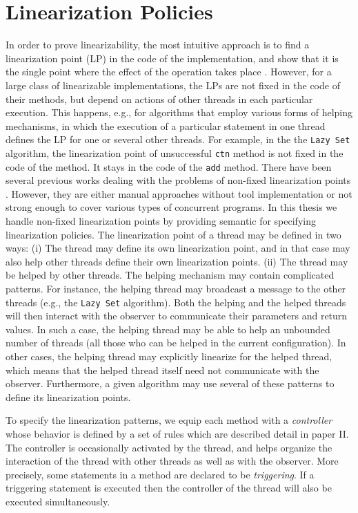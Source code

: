 \section*{Linearization Policies}
\label{controllers:subsection}
In order to prove linearizability, the most intuitive approach is to find a linearization point (LP) in the code of the implementation, and show that it is the single point where the effect of the operation takes place \cite{AHHR:integrated:rep,BLMRS:cav08,Vafeiadis}. However, for a large class of linearizable implementations,
the LPs are not fixed in the code of their methods, but depend on actions
of other threads in each particular execution. This happens, e.g., for algorithms that
employ various forms of helping mechanisms, in which the execution of a particular
statement in one thread defines the LP for one or several other threads. For example, in the the {\tt Lazy Set} algorithm, the linearization point of unsuccessful {\tt ctn} method is not fixed in the code of the method. It stays in the code of the {\tt add} method. There have been several previous works dealing with the problems of non-fixed linearization points \cite{Poling,Colvin:Lazy-List,CGLM:cav06,SWD:cav12,Derrick:fm14,SDW:tcl14,Vafeiadis:cav10,Vafeiadis:Aspect}. However, they are either manual approaches without tool implementation or not strong enough to cover various types of concurrent programs. In this thesis we handle non-fixed linearization points by providing semantic for specifying linearization policies. The linearization point of a thread may be defined in two ways:
(i) The thread may define its own linearization point,
and in that case may also help other threads define their 
own linearization points.
(ii) The thread may be helped by other threads.
%
The helping mechanism may contain complicated patterns.
%
For instance, the helping thread may broadcast a message to the other threads
(e.g., the {\tt Lazy Set} algorithm).
%
Both the helping and the helped threads will then interact with the observer to
communicate their parameters and return values.
%
In such a case, the helping thread may be able to help an unbounded number
of threads (all those who can be helped in the current configuration).
%
In other cases, 
the helping thread may explicitly 
linearize for the helped thread, which means that 
the helped thread itself need not communicate with the observer.
%
%
Furthermore, a given algorithm may use several of these patterns to 
define its linearization points.
%
 

To specify the linearization patterns, we equip each method with a
{\it controller} whose behavior is defined by a set of rules which are described detail in paper II.
%
The controller is occasionally activated by the thread,
and helps organize the interaction  
of the thread with other threads as well as with the observer.
%
More precisely, some 
statements in a  method are declared to be {\it triggering}. If a triggering statement is executed then 
the controller of the thread will also be executed simultaneously.  


